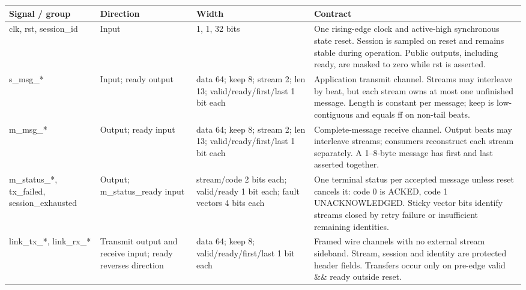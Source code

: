\documentclass[11pt,a4paper]{article}
\begin{document}
{\small\begin{longtable}{@{}L{0.2\textwidth}L{0.12\textwidth}L{0.1\textwidth}L{0.48\textwidth}@{}}\toprule

\textbf{Signal /\allowbreak{} group} & \textbf{Direction} & \textbf{Width} & \textbf{Contract}\\\midrule\endhead

clk,\allowbreak{} rst,\allowbreak{} session\_\allowbreak{}id & Input & 1,\allowbreak{} 1,\allowbreak{} 32 bits & One rising-edge clock and active-high synchronous state reset. Session is sampled on reset and remains stable during operation. Public outputs,\allowbreak{} including ready,\allowbreak{} are masked to zero while rst is asserted.\\[3pt]

s\_\allowbreak{}msg\_\allowbreak{}*\allowbreak{} & Input; ready output & data 64; keep 8; stream 2; len 13; valid/\allowbreak{}ready/\allowbreak{}first/\allowbreak{}last 1 bit each & Application transmit channel. Streams may interleave by beat,\allowbreak{} but each stream owns at most one unfinished message. Length is constant per message; keep is low-contiguous and equals ff on non-tail beats.\\[3pt]

m\_\allowbreak{}msg\_\allowbreak{}*\allowbreak{} & Output; ready input & data 64; keep 8; stream 2; len 13; valid/\allowbreak{}ready/\allowbreak{}first/\allowbreak{}last 1 bit each & Complete-message receive channel. Output beats may interleave streams; consumers reconstruct each stream separately. A 1–8-byte message has first and last asserted together.\\[3pt]

m\_\allowbreak{}status\_\allowbreak{}*\allowbreak{},\allowbreak{} tx\_\allowbreak{}failed,\allowbreak{} session\_\allowbreak{}exhausted & Output; m\_\allowbreak{}status\_\allowbreak{}ready input & stream/\allowbreak{}code 2 bits each; valid/\allowbreak{}ready 1 bit each; fault vectors 4 bits each & One terminal status per accepted message unless reset cancels it: code 0 is ACKED,\allowbreak{} code 1 UNACKNOWLEDGED. Sticky vector bits identify streams closed by retry failure or insufficient remaining identities.\\[3pt]

link\_\allowbreak{}tx\_\allowbreak{}*\allowbreak{},\allowbreak{} link\_\allowbreak{}rx\_\allowbreak{}*\allowbreak{} & Transmit output and receive input; ready reverses direction & data 64; keep 8; valid/\allowbreak{}ready/\allowbreak{}first/\allowbreak{}last 1 bit each & Framed wire channels with no external stream sideband. Stream,\allowbreak{} session and identity are protected header fields. Transfers occur only on pre-edge valid \&\& ready outside reset.\\[3pt]


\end{longtable}}
\end{document}
